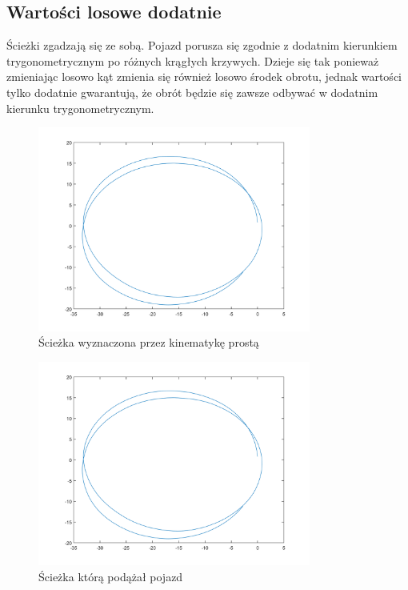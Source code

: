 \documentclass[a4paper, 12pt]{report}
\begin{document}
			\subsection{Wartości losowe dodatnie}
				Ścieżki zgadzają się ze sobą. Pojazd porusza się zgodnie z dodatnim kierunkiem trygonometrycznym po różnych krągłych krzywych. Dzieje się tak ponieważ zmieniając losowo kąt zmienia się również losowo środek obrotu, jednak wartości tylko dodatnie gwarantują, że obrót będzie się zawsze odbywać w dodatnim kierunku trygonometrycznym.
				\begin{figure}[H]
					\centering
					\includegraphics[width = 0.8\textwidth]{./AP/img/random_right_in_1.png}
					\caption{Ścieżka wyznaczona przez kinematykę prostą}
				\end{figure}
				\begin{figure}[H]
					\centering
					\includegraphics[width = 0.8\textwidth]{./AP/img/random_right_in_2.png}
					\caption{Ścieżka którą podążał pojazd}
				\end{figure}
\end{document}
